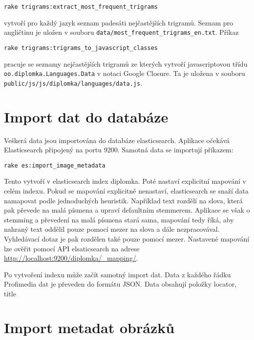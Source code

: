 \begin{lstlisting}
rake trigrams:extract_most_frequent_trigrams
\end{lstlisting}

vytvoří pro každý jazyk seznam padesáti nejčastějších trigramů. Seznam pro angličtinu je uložen v souboru \lstinline{data/most_frequent_trigrams_en.txt}. Příkaz

\begin{lstlisting}
rake trigrams:trigrams_to_javascript_classes
\end{lstlisting}

pracuje se seznamy nejčastějších trigramů ze kterých vytvoří javascriptovou třídu \lstinline{oo.diplomka.Languages.Data} v notaci Google Closure. Ta je uložena v souboru \lstinline{public/js/js/diplomka/languages/data.js}.

\section{Import dat do databáze}

Veškerá data jsou importována do databáze elasticsearch. Aplikace očekává Elasticsearch připojený na portu 9200. Samotná data se importují příkazem:

\begin{lstlisting}
rake es:import_image_metadata
\end{lstlisting}

Tento vytvoří v elasticsearch index diplomka. Poté nastaví explicitní mapování v celém indexu. Pokud se mapování explicitně nenastaví, elasticsearch se snaží data namapovat podle jednoduchých heuristik. Například text rozdělí na slova, která pak převede na malá písmena a upraví defaultním stemmerem. Aplikace se však o stemming a převedení na malá písmena stará sama, mapování tedy říká, aby nahraný text oddělil pouze pomocí mezer na slova a dále nezpracovával. Vyhledávací dotaz je pak rozdělen také pouze pomocí mezer. Nastavené mapování lze ověřit pomocí API elsaticsearch na adrese \url{http://localhost:9200/diplomka/_mapping/}.

Po vytvoření indexu může začít samotný import dat. Data z každého řádku Profimedia dat je převeden do formátu JSON. Data obsahují položky locator, title 

\section{Import metadat obrázků}




